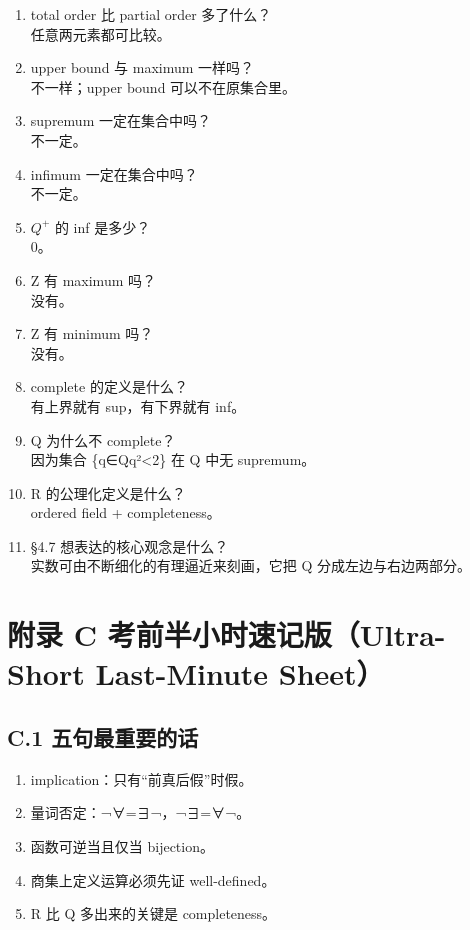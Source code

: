 \documentclass[
  11pt,
]{article}
\providecommand{\tightlist}{%
  \setlength{\itemsep}{0pt}\setlength{\parskip}{0pt}}
\begin{document}
\begin{enumerate}
\def\labelenumi{\arabic{enumi}.}
\setcounter{enumi}{49}
\item
  total order 比 partial order 多了什么？\\
  任意两元素都可比较。
\item
  upper bound 与 maximum 一样吗？\\
  不一样；upper bound 可以不在原集合里。
\item
  supremum 一定在集合中吗？\\
  不一定。
\item
  infimum 一定在集合中吗？\\
  不一定。
\item
  \(Q^+\) 的 inf 是多少？\\
  0。
\item
  Z 有 maximum 吗？\\
  没有。
\item
  Z 有 minimum 吗？\\
  没有。
\item
  complete 的定义是什么？\\
  有上界就有 sup，有下界就有 inf。
\item
  Q 为什么不 complete？\\
  因为集合 \{q∈Q\textbar q²\textless2\} 在 Q 中无 supremum。
\item
  R 的公理化定义是什么？\\
  ordered field + completeness。
\item
  §4.7 想表达的核心观念是什么？\\
  实数可由不断细化的有理逼近来刻画，它把 Q 分成左边与右边两部分。
\end{enumerate}

\section{附录 C 考前半小时速记版（Ultra-Short Last-Minute
Sheet）}\label{ux9644ux5f55-c-ux8003ux524dux534aux5c0fux65f6ux901fux8bb0ux7248ultra-short-last-minute-sheet}

\subsection{C.1
五句最重要的话}\label{c.1-ux4e94ux53e5ux6700ux91cdux8981ux7684ux8bdd}

\begin{enumerate}
\def\labelenumi{\arabic{enumi}.}
\tightlist
\item
  implication：只有``前真后假''时假。\\
\item
  量词否定：¬∀=∃¬，¬∃=∀¬。\\
\item
  函数可逆当且仅当 bijection。\\
\item
  商集上定义运算必须先证 well-defined。\\
\item
  R 比 Q 多出来的关键是 completeness。
\end{enumerate}
\end{document}
